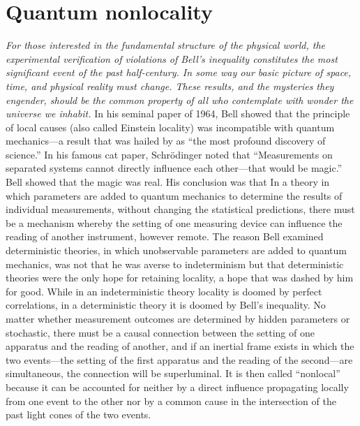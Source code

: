 \section{Quantum nonlocality}\label{nonlocality}
\bq
\emph{For those interested in the fundamental structure of the physical world, the experimental verification of violations of Bell's inequality constitutes the most significant event of the past half-century. In some way our basic picture of space, time, and physical reality must change. These results, and the mysteries they engender, should be the common property of all who contemplate with wonder the universe we inhabit.} \citep[p.~4]{Maudlin}
\eq
In his seminal paper of 1964, Bell showed that the principle of local causes (also called Einstein locality) was incompatible with quantum mechanics---a result that was hailed by \citet{Stapp} as ``the most profound discovery of science.'' In his famous cat paper, Schr\"odinger noted that ``Measurements on separated systems cannot directly influence each other---that would be magic.'' Bell showed that the magic was real. His conclusion was that
\bq
In a theory in which parameters are added to quantum mechanics to determine the results of individual measurements, without changing the statistical predictions, there must be a mechanism whereby the setting of one measuring device can influence the reading of another instrument, however remote. \citep{Bell1964}
\eq
The reason Bell examined deterministic theories, in which unobservable parameters are added to quantum mechanics, was not that he was averse to indeterminism but that deterministic theories were the only hope for retaining locality, a hope that was dashed by him for good. While in an indeterministic theory locality is doomed by perfect correlations, in a deterministic theory it is doomed by Bell's inequality. No matter whether measurement outcomes are determined by hidden parameters or stochastic, there must be a causal connection between the setting of one apparatus and the reading of another, and if an inertial frame exists in which the two events---the setting of the first apparatus and the reading of the second---are simultaneous, the connection will be superluminal. It is then called ``nonlocal'' because it can be accounted for neither by a direct influence propagating locally from one event to the other nor by a common cause in the intersection of the past light cones of the two events.

